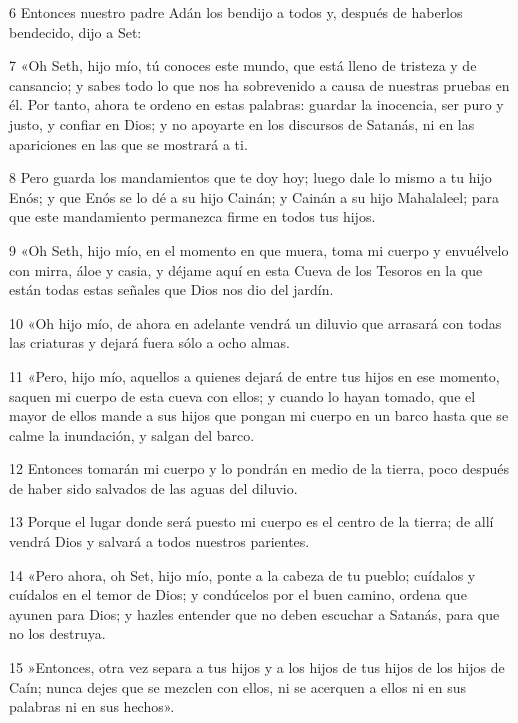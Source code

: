 \par 6 Entonces nuestro padre Adán los bendijo a todos y, después de haberlos bendecido, dijo a Set:

\par 7 «Oh Seth, hijo mío, tú conoces este mundo, que está lleno de tristeza y de cansancio; y sabes todo lo que nos ha sobrevenido a causa de nuestras pruebas en él. Por tanto, ahora te ordeno en estas palabras: guardar la inocencia, ser puro y justo, y confiar en Dios; y no apoyarte en los discursos de Satanás, ni en las apariciones en las que se mostrará a ti.

\par 8 Pero guarda los mandamientos que te doy hoy; luego dale lo mismo a tu hijo Enós; y que Enós se lo dé a su hijo Cainán; y Cainán a su hijo Mahalaleel; para que este mandamiento permanezca firme en todos tus hijos.

\par 9 «Oh Seth, hijo mío, en el momento en que muera, toma mi cuerpo y envuélvelo con mirra, áloe y casia, y déjame aquí en esta Cueva de los Tesoros en la que están todas estas señales que Dios nos dio del jardín.

\par 10 «Oh hijo mío, de ahora en adelante vendrá un diluvio que arrasará con todas las criaturas y dejará fuera sólo a ocho almas.

\par 11 «Pero, hijo mío, aquellos a quienes dejará de entre tus hijos en ese momento, saquen mi cuerpo de esta cueva con ellos; y cuando lo hayan tomado, que el mayor de ellos mande a sus hijos que pongan mi cuerpo en un barco hasta que se calme la inundación, y salgan del barco.

\par 12 Entonces tomarán mi cuerpo y lo pondrán en medio de la tierra, poco después de haber sido salvados de las aguas del diluvio.

\par 13 Porque el lugar donde será puesto mi cuerpo es el centro de la tierra; de allí vendrá Dios y salvará a todos nuestros parientes.

\par 14 «Pero ahora, oh Set, hijo mío, ponte a la cabeza de tu pueblo; cuídalos y cuídalos en el temor de Dios; y condúcelos por el buen camino, ordena que ayunen para Dios; y hazles entender que no deben escuchar a Satanás, para que no los destruya.

\par 15 »Entonces, otra vez separa a tus hijos y a los hijos de tus hijos de los hijos de Caín; nunca dejes que se mezclen con ellos, ni se acerquen a ellos ni en sus palabras ni en sus hechos».


